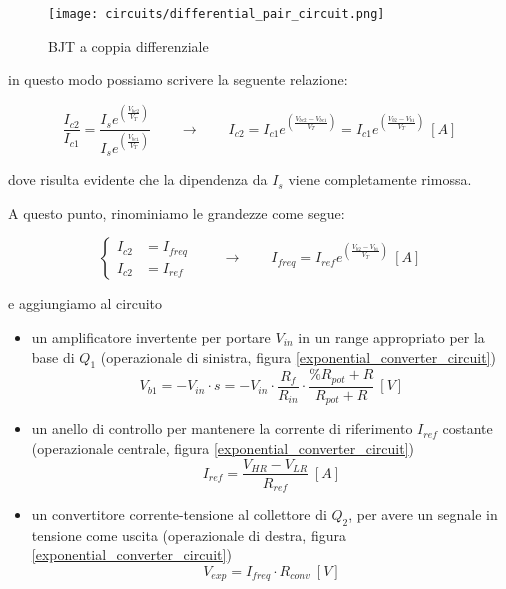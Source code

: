 \begin{figure}[H]
    \centering
    \texttt{[image: circuits/differential\_pair\_circuit.png]}
    \caption{BJT a coppia differenziale}
    \label{differential_pair_circuit}
\end{figure}

in questo modo possiamo scrivere la seguente relazione:

\begin{equation}\label{differential_pair}
    \frac{I_{c2}}{I_{c1}}=\frac{I_s e^{\left(\frac{V_{be2}}{V_T}\right)}}{I_s e^{\left(\frac{V_{be1}}{V_T}\right)}}
    \qquad
    \rightarrow
    \qquad
    I_{c2}=I_{c1}e^{\left(\frac{V_{be2}-V_{be1}}{V_T}\right)}=I_{c1}e^{\left(\frac{V_{b2}-V_{b1}}{V_T}\right)}\ [A]
\end{equation}

dove risulta evidente che la dipendenza da $I_s$ viene completamente rimossa.

A questo punto, rinominiamo le grandezze come segue:

\begin{equation}\label{renamed_differential_pair}
    \left\{ \begin{aligned}
        I_{c2} & = I_{freq} \\
        I_{c2} & = I_{ref}
    \end{aligned} \right.
    \qquad
    \rightarrow
    \qquad
    I_{freq}=I_{ref}e^{\left(\frac{V_{b2}-V_{b1}}{V_T}\right)}\ [A]
\end{equation}

e aggiungiamo al circuito

\begin{itemize}
    \item un amplificatore invertente per portare $V_{in}$ in un range appropriato per la base
          di $Q_1$ (operazionale di sinistra, figura \ref{exponential_converter_circuit})
          \begin{equation}\label{amplifier}
              V_{b1}=-V_{in}\cdot s=
              -V_{in}\cdot\frac{R_f}{R_{in}}\cdot\frac{\%R_{pot}+R}{R_{pot}+R}\ [V]
          \end{equation}
    \item un anello di controllo per mantenere la corrente di riferimento $I_{ref}$ costante
          (operazionale centrale, figura \ref{exponential_converter_circuit})
          \begin{equation}\label{iref}
              I_{ref}=\frac{V_{HR}-V_{LR}}{R_{ref}}\ [A]
          \end{equation}
    \item un convertitore corrente-tensione al collettore di $Q_2$, per avere un segnale in
          tensione come uscita (operazionale di destra, figura \ref{exponential_converter_circuit})
          \begin{equation}\label{ivconv}
              V_{exp}=I_{freq}\cdot R_{conv}\ [V]
          \end{equation}
\end{itemize}


